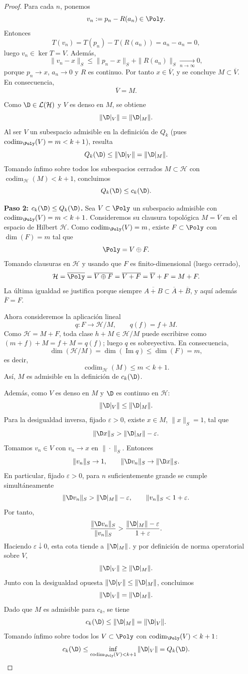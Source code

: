 \begin{proof}
	Para cada $n$, ponemos
	\[
		v_n:=p_n-R(a_n)\in\Poly.
	\]
	Entonces
	\[
		T(v_n)=T(p_n)-T(R(a_n))=a_n-a_n=0,
	\]
	luego $v_n\in\ker T=V$. Además,
	\[
		\|v_n-x\|_S\le \|p_n-x\|_S+\|R(a_n)\|_S\xrightarrow[n\to\infty]{}0,
	\]
	porque $p_n\to x$, $a_n\to0$ y $R$ es continuo. Por tanto $x\in\overline V$, y se concluye $M\subset\overline V$. En consecuencia,
	\[
		\overline V=M.
	\]

	Como $\D\in\mathcal L(\mathcal H)$ y $V$ es denso en $M$, se obtiene
	\[
		\|\D|_V\|=\|\D|_M\|.
	\]
	Al ser $V$ un subespacio admisible en la definición de $Q_k$ (pues $\operatorname{codim}_{\Poly}(V)=m<k+1$), resulta
	\[
		Q_k(\D)\le \|\D|_V\|=\|\D|_M\|.
	\]
	Tomando ínfimo sobre todos los subespacios cerrados $M\subset\mathcal H$ con $\operatorname{codim}_{\mathcal H}(M)<k+1$, concluimos
	\[
		Q_k(\D)\le c_k(\D).
	\]

	\textbf{Paso 2: $c_k(\D) \le Q_k(\D)$.}
	Sea $V \subset \Poly$ un subespacio admisible con $\operatorname{codim}_{\Poly}(V) = m < k+1$. Consideremos su clausura topológica $M = \overline{V}$ en el espacio de Hilbert $\mathcal{H}$.
	Como $\operatorname{codim}_{\Poly}(V)=m$, existe $F\subset\Poly$ con $\dim(F)=m$ tal que
	\[
		\Poly=V\oplus F.
	\]
	Tomando clausuras en $\mathcal{H}$ y usando que $F$ es finito-dimensional (luego cerrado),
	\[
		\mathcal{H}=\overline{\Poly}=\overline{V\oplus F}=\overline{V+F}=\overline V+F=M+F.
	\]
	La última igualdad se justifica porque siempre $\overline{A+B}\subset \overline A+\overline B$, y aquí además $\overline F=F$.

	Ahora consideremos la aplicación lineal
	\[
		q:F\to \mathcal H/M,\qquad q(f)=f+M.
	\]
	Como $\mathcal H=M+F$, toda clase $h+M\in\mathcal H/M$ puede escribirse como $(m+f)+M=f+M=q(f)$; luego $q$ es sobreyectiva. En consecuencia,
	\[
		\dim(\mathcal{H}/M)=\dim(\operatorname{Im}q)\le \dim(F)=m,
	\]
	es decir,
	\[
		\operatorname{codim}_{\mathcal{H}}(M)\le m<k+1.
	\]
	Así, $M$ es admisible en la definición de $c_k(\D)$.

	Además, como $V$ es denso en $M$ y $\D$ es continuo en $\mathcal{H}$:
	\[
		\|\D|_V\|\le \|\D|_M\|.
	\]
	Para la desigualdad inversa, fijado $\varepsilon>0$, existe $x\in M$, $\|x\|_S=1$, tal que
	\[
		\|\D x\|_S>\|\D|_M\|-\varepsilon.
	\]
	Tomamos $v_n\in V$ con $v_n\to x$ en $\|\cdot\|_S$. Entonces
	\[
		\|v_n\|_S\to 1,
		\qquad
		\|\D v_n\|_S\to \|\D x\|_S.
	\]
	En particular, fijado $\varepsilon>0$, para $n$ suficientemente grande se cumple simultáneamente
	\[
		\|\D v_n\|_S>\|\D|_M\|-\varepsilon,
		\qquad
		\|v_n\|_S<1+\varepsilon.
	\]
	Por tanto,
	\[
		\frac{\|\D v_n\|_S}{\|v_n\|_S}
		>
		\frac{\|\D|_M\|-\varepsilon}{1+\varepsilon}.
	\]
	Haciendo $\varepsilon\downarrow 0$, esta cota tiende a $\|\D|_M\|$.
	y por definición de norma operatorial sobre $V$,
	\[
		\|\D|_V\|\ge \|\D|_M\|.
	\]
	Junto con la desigualdad opuesta $\|\D|_V\|\le \|\D|_M\|$, concluimos
	\[
		\|\D|_V\|=\|\D|_M\|.
	\]
	Dado que $M$ es admisible para $c_k$, se tiene
	\[
		c_k(\D)\le \|\D|_M\|=\|\D|_V\|.
	\]
	Tomando ínfimo sobre todos los $V\subset\Poly$ con $\operatorname{codim}_{\Poly}(V)<k+1$:
	\[
		c_k(\D)\le \inf_{\operatorname{codim}_{\Poly}(V)<k+1}\|\D|_V\|=Q_k(\D).
	\]


\end{proof}
